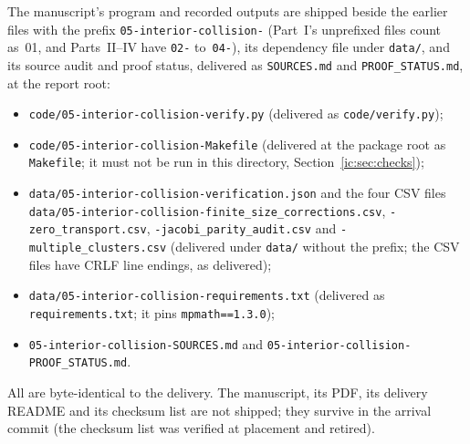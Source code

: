 \documentclass[11pt,a4paper]{article}
\numberwithin{equation}{section}
\theoremstyle{definition}
\theoremstyle{remark}
\begin{document}
The manuscript's program and recorded outputs are shipped beside the earlier
files with the prefix \texttt{05-interior-collision-} (Part~I's unprefixed
files count as~01, and Parts~II--IV have \texttt{02-} to~\texttt{04-}), its
dependency file under \nolinkurl{data/}, and its source audit and proof
status, delivered as \nolinkurl{SOURCES.md} and \nolinkurl{PROOF_STATUS.md},
at the report root:
{\raggedright
\begin{itemize}[leftmargin=2em,itemsep=0pt,topsep=2pt]
\item \nolinkurl{code/05-interior-collision-verify.py} (delivered as
 \nolinkurl{code/verify.py});
\item \nolinkurl{code/05-interior-collision-Makefile} (delivered at the
 package root as \nolinkurl{Makefile}; it must not be run in this
 directory, Section~\ref{ic:sec:checks});
\item \nolinkurl{data/05-interior-collision-verification.json} and the four
 CSV files \nolinkurl{data/05-interior-collision-finite_size_corrections.csv},
 \nolinkurl{-zero_transport.csv}, \nolinkurl{-jacobi_parity_audit.csv} and
 \nolinkurl{-multiple_clusters.csv} (delivered under \nolinkurl{data/}
 without the prefix; the CSV files have CRLF line endings, as delivered);
\item \nolinkurl{data/05-interior-collision-requirements.txt} (delivered as
 \nolinkurl{requirements.txt}; it pins \texttt{mpmath==1.3.0});
\item \nolinkurl{05-interior-collision-SOURCES.md} and
 \nolinkurl{05-interior-collision-PROOF_STATUS.md}.
\end{itemize}}
\noindent All are byte-identical to the delivery.  The manuscript, its PDF,
its delivery README and its checksum list are not shipped; they survive in
the arrival commit (the checksum list was verified at placement and
retired).
\end{document}
